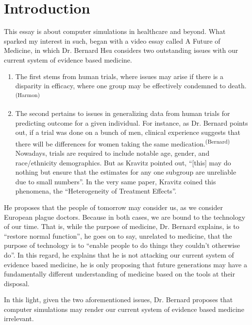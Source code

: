 
\section{Introduction}

This essay is about computer simulations in healthcare and beyond. What sparked my interest in such, began with a video essay called A Future of Medicine, in which Dr. Bernard Hsu considers two outstanding issues with our current system of evidence based medicine. 

\begin{enumerate}
    \item The first stems from human trials, where issues may arise if there is a disparity in efficacy, where one group may be effectively condemned to death.\textsuperscript{(Harmon)}
    \item The second pertains to issues in generalizing data from human trials for predicting outcome for a given individual. For instance, as Dr. Bernard points out, if a trial was done on a bunch of men, clinical experience suggests that there will be differences for women taking the same medication.\textsuperscript{(Bernard)} Nowadays, trials are required to include notable age, gender, and race/ethnicity demographics. But as Kravitz pointed out, ``[this] may do nothing but ensure that the estimates for any one subgroup are unreliable due to small numbers''. In the very same paper, Kravitz coined this phenomena, the ``Heterogeneity of Treatment Effects''. 
\end{enumerate}

He proposes that the people of tomorrow may consider us, as we consider European plague doctors. Because in both cases, we are bound to the technology of our time. That is, while the purpose of medicine, Dr. Bernard explains, is to ``restore normal function'', he goes on to say, unrelated to medicine, that the purpose of technology is to ``enable people to do things they couldn't otherwise do''. In this regard, he explains that he is not attacking our current system of evidence based medicine, he is only proposing that future generations may have a fundamentally different understanding of medicine based on the tools at their disposal.

In this light, given the two aforementioned issues, Dr. Bernard proposes that computer simulations may render our current system of evidence based medicine irrelevant. 

